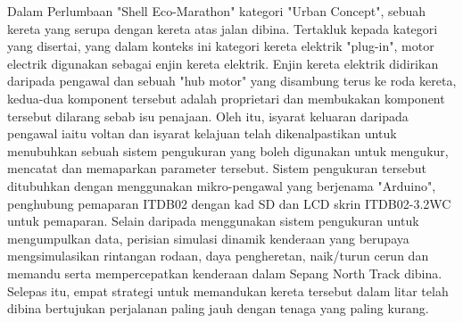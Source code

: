 \begin{MsAbstract}

Dalam Perlumbaan "Shell Eco-Marathon" kategori "Urban Concept", sebuah kereta yang serupa dengan kereta atas jalan dibina. Tertakluk kepada kategori yang disertai, yang dalam konteks ini kategori kereta elektrik "plug-in", motor electrik digunakan sebagai enjin kereta elektrik. Enjin kereta elektrik didirikan daripada pengawal dan sebuah "hub motor" yang disambung terus ke roda kereta, kedua-dua komponent tersebut adalah proprietari dan membukakan komponent tersebut dilarang sebab isu penajaan. Oleh itu, isyarat keluaran daripada pengawal iaitu voltan dan isyarat kelajuan telah dikenalpastikan untuk menubuhkan sebuah sistem pengukuran yang boleh digunakan untuk mengukur, mencatat dan memaparkan parameter tersebut. Sistem pengukuran tersebut ditubuhkan dengan menggunakan mikro-pengawal yang berjenama "Arduino", penghubung pemaparan ITDB02 dengan kad SD dan LCD skrin ITDB02-3.2WC untuk pemaparan. Selain daripada menggunakan sistem pengukuran untuk mengumpulkan data, perisian simulasi dinamik kenderaan yang berupaya mengsimulasikan rintangan rodaan, daya pengheretan, naik/turun cerun dan memandu serta mempercepatkan kenderaan dalam Sepang North Track dibina. Selepas itu, empat strategi untuk memandukan kereta tersebut dalam litar telah dibina bertujukan perjalanan paling jauh dengan tenaga yang paling kurang.  

\end{MsAbstract}
